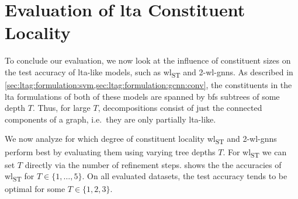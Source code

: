 \section{Evaluation of \acs*{lta} Constituent Locality}%
\label{sec:eval:lta}

To conclude our evaluation, we now look at the influence of constituent sizes on the test accuracy of \acs{lta}-like models, such as \acs{wl}\textsubscript{ST} and 2-\acs{wl}-\acsp{gnn}.
As described in \cref{sec:ltag:formulation:svm,sec:ltag:formulation:gcnn:conv}, the constituents in the \ac{lta} formulations of both of these models are spanned by \ac{bfs} subtrees of some depth $T$.
Thus, for large $T$, decompositions consist of just the connected components of a graph, i.e.\ they are only partially \acs{lta}-like.

We now analyze for which degree of constituent locality \acs{wl}\textsubscript{ST} and 2-\acs{wl}-\acsp{gnn} perform best by evaluating them using varying tree depths $T$.
For \acs{wl}\textsubscript{ST} we can set $T$ directly via the number of refinement steps.
 shows the the accuracies of \acs{wl}\textsubscript{ST} for $T \in \{ 1, \dots, 5 \}$.
On all evaluated datasets, the test accuracy tends to be optimal for some $T \in \{ 1, 2, 3 \}$.%
\newcommand{\wlstDepthPlot}[4][ymin=70, ymax=100, try min ticks=6]{%
\begin{tikzpicture}
	\begin{axis}[
		width=0.35\linewidth,
		height=0.3\linewidth,
		xmin=0.7, xmax=5.3,
		#1,
		label style={font=\tiny},
		tick label style={font=\tiny},
		ymajorgrids,
		ytick style={draw=none},
		ylabel shift=-6pt,
		xlabel shift=-5pt,
		axis line style={gray},
		mark size={1.5pt},
		title={\small #3},
		title style={yshift=-0.5em}
	]
		\begin{scope}[gray]
			\draw[gray, dashed] ({axis cs:#4,0}|-{rel axis cs:0,1}) -- ({axis cs:#4,0}|-{rel axis cs:0,0});
		\end{scope}
		\addplot [color=t_blue, only marks, mark=*]
		plot[error bars/.cd, y dir=both, y explicit]
		table [x=T, y=#2TrainMean, y error=#2TrainStd, col sep=semicolon] {data/wlst_depths.csv};
		\label{pgfplots:eval:wlst-depth:#2-train}
		\addplot [color=t_red, only marks, mark=square*]
		plot[error bars/.cd, y dir=both, y explicit]
		table [x=T, y=#2TestMean, y error=#2TestStd, col sep=semicolon] {data/wlst_depths.csv};
		\label{pgfplots:eval:wlst-depth:#2-test}
	\end{axis}
\end{tikzpicture}} %

